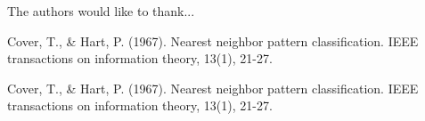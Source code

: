 \documentclass[conference]{IEEEtran}
\begin{document}
The authors would like to thank...







%
%
%
\begin{thebibliography}{1}

Cover, T., \& Hart, P. (1967). Nearest neighbor pattern classification. IEEE transactions on information theory, 13(1), 21-27.

Cover, T., \& Hart, P. (1967). Nearest neighbor pattern classification. IEEE transactions on information theory, 13(1), 21-27.


\end{thebibliography}




\end{document}
